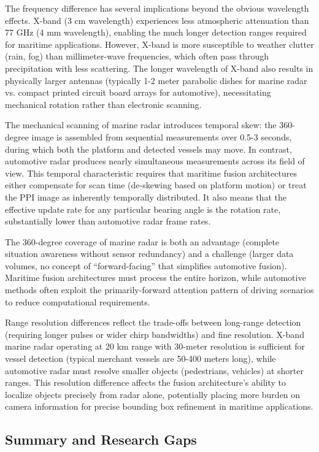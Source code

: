 The frequency difference has several implications beyond the obvious wavelength effects. X-band (3 cm wavelength) experiences less atmospheric attenuation than 77 GHz (4 mm wavelength), enabling the much longer detection ranges required for maritime applications. However, X-band is more susceptible to weather clutter (rain, fog) than millimeter-wave frequencies, which often pass through precipitation with less scattering. The longer wavelength of X-band also results in physically larger antennas (typically 1-2 meter parabolic dishes for marine radar vs. compact printed circuit board arrays for automotive), necessitating mechanical rotation rather than electronic scanning.

The mechanical scanning of marine radar introduces temporal skew: the 360-degree image is assembled from sequential measurements over 0.5-3 seconds, during which both the platform and detected vessels may move. In contrast, automotive radar produces nearly simultaneous measurements across its field of view. This temporal characteristic requires that maritime fusion architectures either compensate for scan time (de-skewing based on platform motion) or treat the PPI image as inherently temporally distributed. It also means that the effective update rate for any particular bearing angle is the rotation rate, substantially lower than automotive radar frame rates.

The 360-degree coverage of marine radar is both an advantage (complete situation awareness without sensor redundancy) and a challenge (larger data volumes, no concept of ``forward-facing'' that simplifies automotive fusion). Maritime fusion architectures must process the entire horizon, while automotive methods often exploit the primarily-forward attention pattern of driving scenarios to reduce computational requirements.

Range resolution differences reflect the trade-offs between long-range detection (requiring longer pulses or wider chirp bandwidths) and fine resolution. X-band marine radar operating at 20 km range with 30-meter resolution is sufficient for vessel detection (typical merchant vessels are 50-400 meters long), while automotive radar must resolve smaller objects (pedestrians, vehicles) at shorter ranges. This resolution difference affects the fusion architecture's ability to localize objects precisely from radar alone, potentially placing more burden on camera information for precise bounding box refinement in maritime applications.

\subsection{Summary and Research Gaps}

